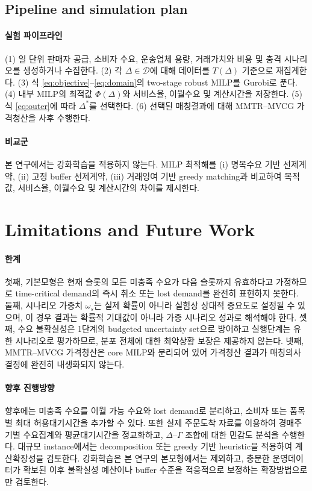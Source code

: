 \documentclass[11pt,a4paper]{article}
\newcommand{\Dset}{\mathcal{D}}
\begin{document}
\subsection{Pipeline and simulation plan}
\paragraph{실험 파이프라인} (1) 일 단위 판매자 공급, 소비자 수요, 운송업체 용량, 거래가치와 비용 및 충격 시나리오를 생성하거나 수집한다. (2) 각 $\Delta\in\Dset$에 대해 데이터를 $T(\Delta)$ 기준으로 재집계한다. (3) 식 \eqref{eq:objective}--\eqref{eq:domain}의 two-stage robust MILP를 Gurobi로 푼다. (4) 내부 MILP의 최적값 $\Phi(\Delta)$와 서비스율, 이월수요 및 계산시간을 저장한다. (5) 식 \eqref{eq:outer}에 따라 $\Delta^*$를 선택한다. (6) 선택된 매칭결과에 대해 MMTR--MVCG 가격청산을 사후 수행한다.

\paragraph{비교군} 본 연구에서는 강화학습을 적용하지 않는다. MILP 최적해를 (i) 명목수요 기반 선제계약, (ii) 고정 buffer 선제계약, (iii) 거래잉여 기반 greedy matching과 비교하여 목적값, 서비스율, 이월수요 및 계산시간의 차이를 제시한다.

\section{Limitations and Future Work}
\paragraph{한계} 첫째, 기본모형은 현재 슬롯의 모든 미충족 수요가 다음 슬롯까지 유효하다고 가정하므로 time-critical demand의 즉시 취소 또는 lost demand를 완전히 표현하지 못한다. 둘째, 시나리오 가중치 $\omega_s$는 실제 확률이 아니라 실험상 상대적 중요도로 설정될 수 있으며, 이 경우 결과는 확률적 기대값이 아니라 가중 시나리오 성과로 해석해야 한다. 셋째, 수요 불확실성은 1단계의 budgeted uncertainty set으로 방어하고 실행단계는 유한 시나리오로 평가하므로, 분포 전체에 대한 최악상황 보장은 제공하지 않는다. 넷째, MMTR--MVCG 가격청산은 core MILP와 분리되어 있어 가격청산 결과가 매칭의사결정에 완전히 내생화되지 않는다.

\paragraph{향후 진행방향} 향후에는 미충족 수요를 이월 가능 수요와 lost demand로 분리하고, 소비자 또는 품목별 최대 허용대기시간을 추가할 수 있다. 또한 실제 주문도착 자료를 이용하여 경매주기별 수요집계와 평균대기시간을 정교화하고, $\Delta$--$\Gamma$ 조합에 대한 민감도 분석을 수행한다. 대규모 instance에서는 decomposition 또는 greedy 기반 heuristic을 적용하여 계산확장성을 검토한다. 강화학습은 본 연구의 본모형에서는 제외하고, 충분한 운영데이터가 확보된 이후 불확실성 예산이나 buffer 수준을 적응적으로 보정하는 확장방법으로만 검토한다.
\end{document}
